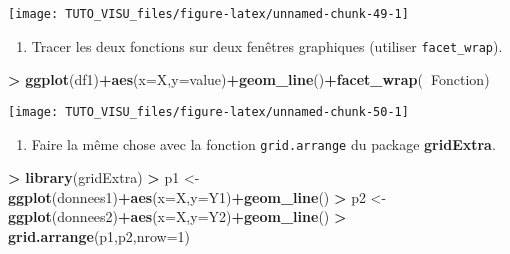\documentclass[]{article}
\newenvironment{Shaded}{\begin{snugshade}}{\end{snugshade}}
\newcommand{\DataTypeTok}[1]{\textcolor[rgb]{0.13,0.29,0.53}{#1}}
\newcommand{\DecValTok}[1]{\textcolor[rgb]{0.00,0.00,0.81}{#1}}
\newcommand{\KeywordTok}[1]{\textcolor[rgb]{0.13,0.29,0.53}{\textbf{#1}}}
\newcommand{\NormalTok}[1]{#1}
\newcommand{\OperatorTok}[1]{\textcolor[rgb]{0.81,0.36,0.00}{\textbf{#1}}}
\newcommand{\StringTok}[1]{\textcolor[rgb]{0.31,0.60,0.02}{#1}}
\providecommand{\tightlist}{%
  \setlength{\itemsep}{0pt}\setlength{\parskip}{0pt}}
\theoremstyle{definition}
\theoremstyle{definition}
\theoremstyle{definition}
\theoremstyle{remark}
\begin{document}
\begin{center}\texttt{[image: TUTO\_VISU\_files/figure-latex/unnamed-chunk-49-1]} \end{center}

\begin{enumerate}
\def\labelenumi{\arabic{enumi}.}
\setcounter{enumi}{3}
\tightlist
\item
  Tracer les deux fonctions sur deux fenêtres graphiques (utiliser \texttt{facet\_wrap}).
\end{enumerate}

\begin{Shaded}
\begin{Highlighting}[]
\OperatorTok{>}\StringTok{ }\KeywordTok{ggplot}\NormalTok{(df1)}\OperatorTok{+}\KeywordTok{aes}\NormalTok{(}\DataTypeTok{x=}\NormalTok{X,}\DataTypeTok{y=}\NormalTok{value)}\OperatorTok{+}\KeywordTok{geom_line}\NormalTok{()}\OperatorTok{+}\KeywordTok{facet_wrap}\NormalTok{(}\OperatorTok{~}\NormalTok{Fonction)}
\end{Highlighting}
\end{Shaded}

\begin{center}\texttt{[image: TUTO\_VISU\_files/figure-latex/unnamed-chunk-50-1]} \end{center}

\begin{enumerate}
\def\labelenumi{\arabic{enumi}.}
\setcounter{enumi}{4}
\tightlist
\item
  Faire la même chose avec la fonction \texttt{grid.arrange} du package \textbf{gridExtra}.
\end{enumerate}

\begin{Shaded}
\begin{Highlighting}[]
\OperatorTok{>}\StringTok{ }\KeywordTok{library}\NormalTok{(gridExtra)}
\OperatorTok{>}\StringTok{ }\NormalTok{p1 <-}\StringTok{ }\KeywordTok{ggplot}\NormalTok{(donnees1)}\OperatorTok{+}\KeywordTok{aes}\NormalTok{(}\DataTypeTok{x=}\NormalTok{X,}\DataTypeTok{y=}\NormalTok{Y1)}\OperatorTok{+}\KeywordTok{geom_line}\NormalTok{()}
\OperatorTok{>}\StringTok{ }\NormalTok{p2 <-}\StringTok{ }\KeywordTok{ggplot}\NormalTok{(donnees2)}\OperatorTok{+}\KeywordTok{aes}\NormalTok{(}\DataTypeTok{x=}\NormalTok{X,}\DataTypeTok{y=}\NormalTok{Y2)}\OperatorTok{+}\KeywordTok{geom_line}\NormalTok{()}
\OperatorTok{>}\StringTok{ }\KeywordTok{grid.arrange}\NormalTok{(p1,p2,}\DataTypeTok{nrow=}\DecValTok{1}\NormalTok{)}
\end{Highlighting}
\end{Shaded}
\end{document}
